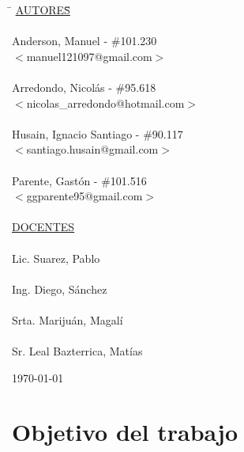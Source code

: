 \begin{titlepage}
	\begin{tabbing}
		\hspace{2cm}\=\+
		\underline{AUTORES}\hspace{-1cm}\=\+\hspace{1cm}\=\hspace{6cm}\=\\
		\\
		Anderson, Manuel			\>\>- \#101.230\\
		\>\footnotesize{$<$manuel121097@gmail.com$>$}\\
		\\
		Arredondo, Nicolás			\>\>- \#95.618\\
		\>\footnotesize{$<$nicolas\_arredondo@hotmail.com$>$}\\
		\\
		Husain, Ignacio Santiago	\>\>- \#90.117\\
		\>\footnotesize{$<$santiago.husain@gmail.com$>$}\\
		\\
		Parente, Gastón			 	\>\>- \#101.516 \\
		\>\footnotesize{$<$ggparente95@gmail.com$>$}\\
		\\
		\<\underline{DOCENTES}\\
		\\
		Lic. Suarez, Pablo \\
		\\
		Ing. Diego, Sánchez \\
		\\
		Srta. Marijuán, Magalí\\
		\\
		Sr. Leal Bazterrica, Matías
	\end{tabbing}


	\today

\end{titlepage}

\clearpage
\tableofcontents
\clearpage
\section{Objetivo del trabajo}

